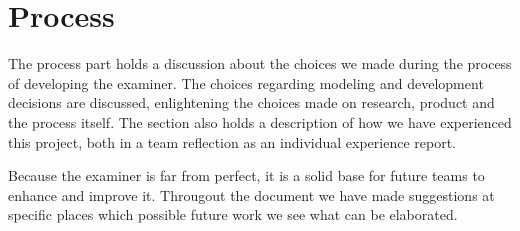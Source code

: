 



\section{Process}

The process part holds a discussion about the choices we made
during the process of developing the \gls{examiner}. The choices regarding 
modeling and development decisions are discussed, enlightening the choices made
on research, product and the process itself. The section also holds a description of how we have experienced this project, both in a team reflection
as an individual experience report.



Because the \gls{examiner} is far from perfect, it is a solid base for future
teams to enhance and improve it.
Througout the document we have made suggestions at specific places which possible
future work we see what can be elaborated.